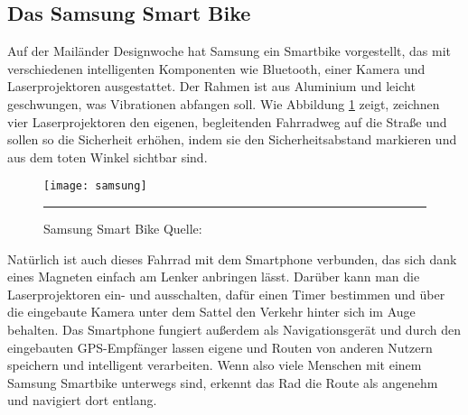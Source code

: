 \subsection{Das Samsung Smart Bike}
Auf der Mailänder Designwoche hat Samsung ein Smartbike vorgestellt, das mit verschiedenen intelligenten Komponenten wie Bluetooth, einer Kamera und Laserprojektoren ausgestattet. Der Rahmen ist aus Aluminium und leicht geschwungen, was Vibrationen abfangen soll. Wie Abbildung \ref{fig:samsung} zeigt, zeichnen vier Laserprojektoren den eigenen, begleitenden Fahrradweg auf die Straße und sollen so die Sicherheit erhöhen, indem sie den Sicherheitsabstand markieren und aus dem toten Winkel sichtbar sind. 
\begin{figure}[H]
    \centering
    \texttt{[image: samsung]}
    \rule{35em}{0.5pt}
    \caption[Samsung Smart Bike]{Samsung Smart Bike  Quelle: \cite{smartbike}} 
    \label{fig:samsung}
\end{figure}
Natürlich ist auch dieses Fahrrad mit dem \gls{Smartphone} verbunden, das sich dank eines Magneten einfach am Lenker anbringen lässt. Darüber kann man die Laserprojektoren ein- und ausschalten, dafür einen Timer bestimmen und über die eingebaute Kamera unter dem Sattel den Verkehr hinter sich im Auge behalten. Das \gls{Smartphone} fungiert außerdem als Navigationsgerät und durch den eingebauten \gls{GPS}-Empfänger lassen eigene und Routen von anderen Nutzern speichern und intelligent verarbeiten\cite{smartbike}. Wenn also viele Menschen mit einem Samsung Smartbike unterwegs sind, erkennt das Rad die Route als angenehm und navigiert dort entlang. 
